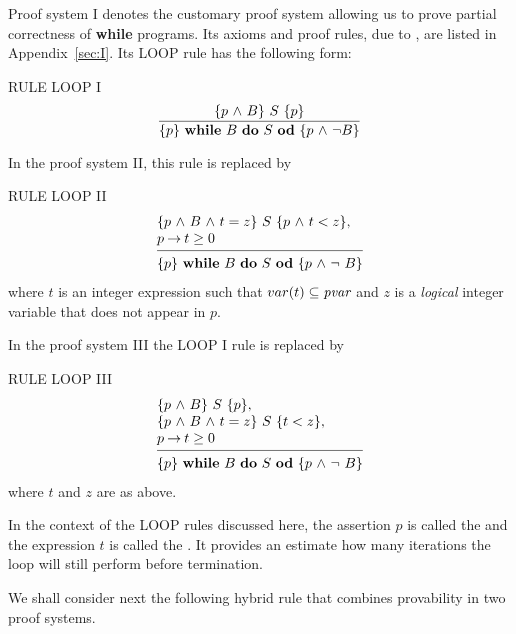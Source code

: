 \documentclass[runningheads]{llncs}       %
\begin{document}
Proof system I denotes the customary proof system allowing us to prove 
partial correctness of {\bf while} programs.  
Its axioms and proof rules, due to \cite{Hoa69}, are listed in Appendix~\ref{sec:I}.
Its LOOP rule has the following form:
\III

\NI
RULE LOOP I
\[ 
 \frac{ \mbox{$\{{p \mbox{$\ \wedge\ $} B}\}\ {S}\ \{{p}\}$}                }
      { \mbox{$\{{p}\}\ {\mbox{$\mbox{{\bf while}\ } {B}\ \mbox{{\bf do}\ } {S}\ \mbox{{\bf od}}$}}\ \{{p \mbox{$\ \wedge\ $} \neg B}\}$}  }
\]
\III


In the proof system II, this rule  is replaced by
\III

\NI
RULE LOOP II
\[
 \begin{array}{l}
  \HT{p \A B \A t=z}{S}{p \A t<z},          \\
  p \ra t \geq 0                           \\
  [-\medskipamount]
  \hrulefill                                \\
  \HT{p}{\WDD{B}{S}}{p \A \neg\ B}
 \end{array}
\]
where $t$ is an integer expression such that  $var(t)\subseteq \mbox{\it pvar}$
and $z$ is a \emph{logical} integer variable that does not appear in $p$.


\III

In the proof system III the  LOOP I rule is replaced by
\III

\NI
RULE \label{rul:loop2} LOOP III
\[
 \begin{array}{l}
  \HT{p \A B}{S}{p},                      \\
  \HT{p \A B \A t=z}{S}{t<z},             \\
  p \ra t \geq 0                         \\
  [-\medskipamount]
  \hrulefill                              \\
  \HT{p}{\WDD{B}{S}}{p \A \neg\ B}
 \end{array}
\]
%
\NI
where $t$ and $z$ are as above.

\III

In the context of the LOOP rules discussed here, 
the assertion $p$ is called the  and the expression $t$
is called the . It provides an estimate how
many iterations the loop will still perform before termination.

We shall consider next the following hybrid rule that combines provability in two
proof systems.
\III
\end{document}
